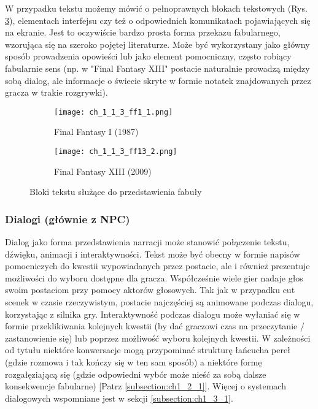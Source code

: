 W przypadku tekstu możemy mówić o pełnoprawnych blokach tekstowych (Rys. \ref{fig:ch1_2_2_text}),
elementach interfejsu czy też o odpowiednich komunikatach pojawiających się na ekranie. Jest to
oczywiście bardzo prosta forma przekazu fabularnego, wzorująca się na szeroko pojętej literaturze.
Może być wykorzystany jako główny sposób prowadzenia opowieści lub jako element pomocniczny, często
robiący fabularnie sens (np. w "Final Fantasy XIII" postacie naturalnie prowadzą między sobą dialog,
ale informacje o świecie skryte w formie notatek znajdowanych przez gracza w trakie rozgrywki).

\begin{figure}[h]
	\begin{subfigure}{0.49\textwidth}
		\caption{Final Fantasy I (1987)}
		\texttt{[image: ch\_1\_1\_3\_ff1\_1.png]}
		\label{subfig:ch_1_2_2_text1}
	\end{subfigure}
	\begin{subfigure}{0.49\textwidth}
		\caption{Final Fantasy XIII (2009)}
		\texttt{[image: ch\_1\_1\_3\_ff13\_2.png]}
		\label{subfig:ch_1_2_2_text2}
	\end{subfigure}
	\caption{Bloki tekstu służące do przedstawienia fabuły}
	\label{fig:ch1_2_2_text}
\end{figure}

\subsubsection*{Dialogi (głównie z NPC)}

Dialog jako forma przedstawienia narracji może stanowić połączenie tekstu, dźwięku, animacji i
interaktywności. Tekst może być obecny w formie napisów pomocniczych do kwestii wypowiadanych przez
postacie, ale i również prezentuje możliwości do wyboru dostępne dla gracza. Współcześnie wiele gier
nadaje głos swoim postaciom przy pomocy aktorów głosowych. Tak jak w przypadku cut scenek w czasie
rzeczywistym, postacie najczęściej są animowane podczas dialogu, korzystając z silnika gry.
Interaktywność podczas dialogu może wyłaniać się w formie przeklikiwania kolejnych kwestii (by dać
graczowi czas na przeczytanie / zastanowienie się) lub poprzez możliwość wyboru kolejnych kwestii.
W zależności od tytułu niektóre konwersacje mogą przypominać strukturę łańcucha pereł (gdzie
rozmowa i tak kończy się w ten sam sposób) a niektóre formę rozgałęziającą się (gdzie odpowiedni
wybór może nieść za sobą dalsze konsekwencje fabularne) [Patrz \ref{subsection:ch1_2_1}]. Więcej
o systemach dialogowych wspomniane jest w sekcji \ref{subsection:ch1_3_1}.


